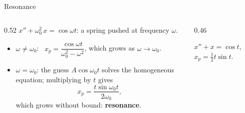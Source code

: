 \documentclass[10pt]{wosm-slides}
\begin{document}
\begin{frame}{Resonance}
  \begin{columns}[c]
    \begin{column}{0.52\textwidth}
      $x'' + \omega_0^2\, x = \cos\omega t$: a spring pushed at frequency $\omega$.
      \pause
      \begin{itemize}
        \item $\omega \ne \omega_0$: \ $x_p = \dfrac{\cos\omega t}{\omega_0^2 - \omega^2}$, which grows as
          $\omega \to \omega_0$.
        \pause
        \item $\omega = \omega_0$: the guess $A\cos\omega_0 t$ solves the homogeneous equation; multiplying by
          $t$ gives
          \[ x_p = \frac{t \sin\omega_0 t}{2\omega_0} , \]
          which grows without bound: \textbf{resonance}.
      \end{itemize}
    \end{column}
    \begin{column}{0.46\textwidth}
      \centering
      \par\small $x'' + x = \cos t$, \ $x_p = \frac12 t\sin t$.
    \end{column}
  \end{columns}
\end{frame}
\end{document}
